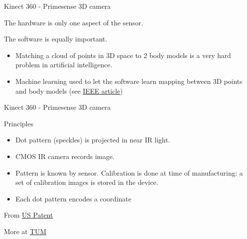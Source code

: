 \documentclass[compress]{beamer}
\begin{document}
\begin{frame}{Kinect 360 - Primesense 3D camera}

    The hardware is only one aspect of the sensor.

    The software is equally important.

    \begin{itemize}

        \item
              Matching a cloud of points in 3D space to 2 body models is a very hard
              problem in artificial intelligence.
        \item
              Machine learning used to let the software learn mapping between 3D
              points and body models (see
              \href{http://www.theinstitute.ieee.org/portal/site/tionline/menuitem.130a3558587d56e8fb2275875bac26c8/index.jsp?\&pName=institute_level1_article\&TheCat=2201\&article=tionline/legacy/inst2011/jan11/featuretech.xml\&}{IEEE
              article})
    \end{itemize}

\end{frame}

\begin{frame}{Kinect 360 - Primesense 3D camera}

    Principles

    \begin{itemize}

        \item
              Dot pattern (speckles) is projected in near IR light.
        \item
              CMOS IR camera records image.
        \item
              Pattern is known by sensor. Calibration is done at time of
              manufacturing: a set of calibration images is stored in the device.
        \item
              Each dot pattern encodes a coordinate
    \end{itemize}

    From
    \href{http://worldwide.espacenet.com/publicationDetails/originalDocument?FT=D\&date=20100909\&DB=EPODOC\&locale=en_EP\&CC=US\&NR=2010225746A1\&KC=A1}{US
    Patent}

    More at
    \href{http://campar.in.tum.de/twiki/pub/Chair/TeachingSs11Kinect/2011-DSensors_LabCourse_Kinect.pdf}{TUM}

\end{frame}
\end{document}
